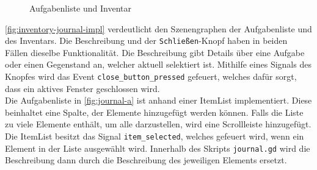 \begin{figure}[H]%
    \centering
    \qquad
    \caption{Aufgabenliste und Inventar}%
    \label{fig:inventory-journal-impl}%
\end{figure}

\autoref{fig:inventory-journal-impl} verdeutlicht den Szenengraphen der Aufgabenliste und des Inventars.
Die Beschreibung und der \texttt{Schließen}-Knopf haben in beiden Fällen dieselbe Funktionalität.
Die Beschreibung gibt Details über eine Aufgabe oder einen Gegenstand an, welcher aktuell selektiert ist.
Mithilfe eines Signals des Knopfes wird das Event \texttt{close\_button\_pressed} gefeuert, welches dafür sorgt, dass ein aktives Fenster geschlossen wird. \\

Die Aufgabenliste in \autoref{fig:journal-a} ist anhand einer ItemList implementiert\cite{godot-itemlist}.
Diese beinhaltet eine Spalte, der Elemente hinzugefügt werden können.
Falls die Liste zu viele Elemente enthält, um alle darzustellen, wird eine Scrollleiste hinzugefügt.
Die ItemList besitzt das Signal \texttt{item\_selected}, welches gefeuert wird, wenn ein Element in der Liste ausgewählt wird.
Innerhalb des Skripts \texttt{journal.gd} wird die Beschreibung dann durch die Beschreibung des jeweiligen Elements ersetzt.\\

